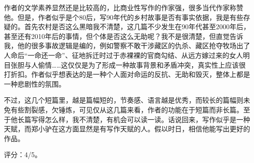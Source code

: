 作者的文学素养显然还是比较高的，比商业性写作的作家强，很多当代作家称赞他。但是，作者似乎是个80后，写90年代的乡村故事是否有事实依据，我是有些存疑的。首先农村是否这么黑暗我不清楚，这几篇不少发生在90年代甚至2000年后，甚至还有2010年后的事情，但个体是否这么无助呢？我不是很清楚，但直觉告诉我，他的很多事故逻辑是编的，例如警察不敢干涉藏区的仇杀、藏区抢夺牧场出了人命后“一命还一命”、征地拆迁时过于赤裸裸的官商勾结、从远方嫁过来的女人明目张胆与人偷情……这仅仅是为了形成一种故事背景和矛盾冲突，真实性上应该很打折扣。作者似乎想表达的是一种个人面对命运的反抗、无助和毁灭，整体上都是一种悲剧性的氛围。

不过，这几个短篇里，越是篇幅短的，节奏感、语言越是优秀，而较长的篇幅则未免有些割裂感，欠锤炼，可见仅从这几篇来看，作者的功能在于短篇而非长篇。至于他长篇写得怎么样，我不清楚，有机会可以读一读。话说回来，写作似乎是一种天赋，而郑小驴在这方面显然是有写作天赋的人。假以时日，相信他能写出更好的作品。

评分：4/5。
